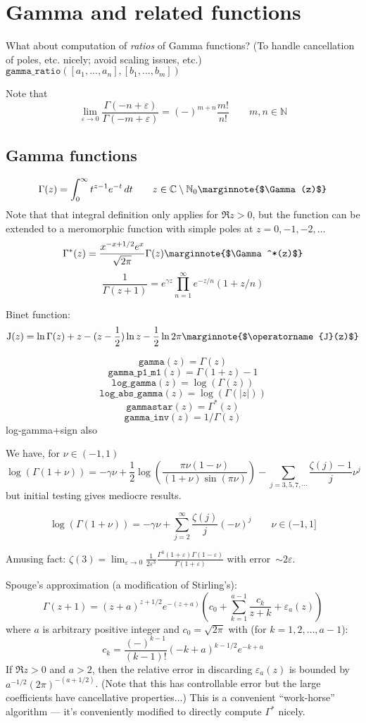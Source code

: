 \documentclass[10pt,dvipdfmx,letterpaper,twoside]{article}
\newcommand{\F}[1]{{\mathtt{#1}}}
\let\O=\operatorname
\newcommand{\CC}{{\mathbb{C}}}
\newcommand{\NN}{{\mathbb{N}}}
\newcommand{\NNo}{{\mathbb{N}_0}}
\let\DEF=\marginnote
\let\gam=\gamma
\let\Gam=\Gamma
\let\eps=\varepsilon
\begin{document}
\section{Gamma and related functions}

What about computation of {\em ratios} of Gamma functions?
(To handle cancellation of poles, etc. nicely; avoid scaling issues, etc.)
$\F{gamma\_ratio}([a_1,...,a_n], [b_1,...,b_m])$

Note that
\[ \lim_{\eps\to0}\frac{\Gam(-n+\eps)}{\Gam(-m+\eps)} = (-)^{m+n}\frac{m!}{n!} \qquad m,n\in\NN \]


\subsection{Gamma functions}
\[ \Gam(z) = \int_0^\infty t^{z-1}e^{-t}\,dt \qquad z\in\CC\setminus\NNo  \DEF{$\Gam(z)$}\]
Note that that integral definition only applies for $\Re z>0$, but the function can be extended
to a meromorphic function with simple poles at $z=0,-1,-2,\dots$
\[ \Gam^*(z) = \frac{x^{-x+1/2} e^{x}}{\sqrt{2\pi}} \Gam(z)   \DEF{$\Gam^*(z)$}\]
\[ \frac{1}{\Gam(z+1)} = e^{\gamma z}\prod_{n=1}^\infty e^{-z/n}(1 + z/n) \]

Binet function:
\[ \O{J}(z) = \ln\Gam(z) + z - (z-\frac12)\ln z - \frac12\ln2\pi    \DEF{$\O{J}(z)$}\]

\[ \F{gamma}(z) = \Gam(z) \]
\[ \F{gamma\_p1\_m1}(z) = \Gam(1+z)-1 \]
\[ \F{log\_gamma}(z) = \log(\Gam(z)) \]
\[ \F{log\_abs\_gamma}(z) = \log(\Gam(|z|)) \]
\[ \F{gammastar}(z) = \Gam^*(z) \]
\[ \F{gamma\_inv}(z) = 1/\Gam(z) \]
log-gamma+sign also

We have, for $\nu\in(-1,1)$
\[ \log(\Gam(1+\nu)) = -\gam\nu + \frac12\log(\frac{\pi\nu(1-\nu)}{(1+\nu)\sin(\pi\nu)}) - \sum_{j=3,5,7,\cdots}\frac{\zeta(j)-1}{j}\nu^j\]
but initial testing gives mediocre results.

\[ \log(\Gam(1+\nu)) = -\gam\nu + \sum_{j=2}^\infty\frac{\zeta(j)}{j}(-\nu)^j \qquad \nu\in(-1,1] \]

Amusing fact: $\zeta(3) = \lim_{\eps\to0}\frac{1}{2\eps^3}\frac{\Gam^3(1+\eps)\Gam(1-\eps)}{\Gam(1+\eps)}$ with error~$\sim2\eps$.

Spouge's approximation (a modification of Stirling's):
\[ \Gam(z+1) = (z+a)^{z+1/2}e^{-(z+a)}\left( c_0 + \sum_{k=1}^{a-1}\frac{c_k}{z+k} + \eps_a(z) \right) \]
where $a$ is arbitrary positive integer and $c_0=\sqrt{2\pi}$ with (for $k=1,2,\dots,a-1$):
\[ c_k = \frac{(-)^{k-1}}{(k-1)!}(-k+a)^{k-1/2}e^{-k+a} \]
If $\Re z>0$ and $a>2$, then the relative error in discarding $\eps_a(z)$ is bounded by $a^{-1/2}(2\pi)^{-(a+1/2)}$.
(Note that this has controllable error but the large coefficients have cancellative properties...)
This is a convenient ``work-horse'' algorithm --- it's conveniently modified to directly compute $\Gam^*$ nicely.
\end{document}
